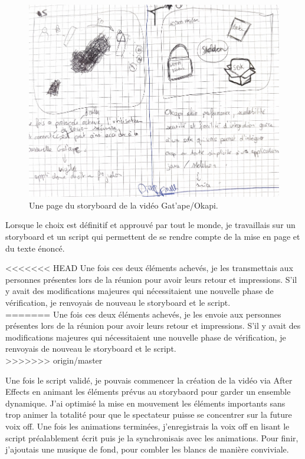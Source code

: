 \begin{figure}[htp]
  \centering
  \includegraphics[width=15cm]{images/sb/sb1}
  \caption{Une page du storyboard de la vidéo Gat'ape/Okapi.}
  \label{sbzbus}
\end{figure}




Lorsque le choix est définitif et approuvé par tout le monde, je travaillais sur un storyboard et un script qui permettent de se rendre compte de la mise en page et du texte énoncé. 


<<<<<<< HEAD
Une fois ces deux éléments achevés, je les transmettais aux personnes présentes lors de la réunion pour avoir leurs retour et impressions. S'il y avait des modifications majeures qui nécessitaient une nouvelle phase de vérification, je renvoyais de nouveau le storyboard et le script.\\
=======
Une fois ces deux éléments achevés, je les envoie aux personnes présentes lors de la réunion pour avoir leurs retour et impressions. S'il y avait des modifications majeures qui nécessitaient une nouvelle phase de vérification, je renvoyais de nouveau le storyboard et le script.\\
>>>>>>> origin/master


Une fois le script validé, je pouvais commencer la création de la vidéo via After Effects en animant les éléments prévus au storybaord pour garder un ensemble dynamique. J'ai optimisé la mise en mouvement les éléments importants sans trop animer la totalité pour que le spectateur puisse se concentrer sur la future voix off. Une fois les animations terminées, j'enregistrais la voix off en lisant le script préalablement écrit puis je la synchronisais avec les animations. Pour finir, j'ajoutais une musique de fond, pour combler les blancs de manière conviviale.\\

